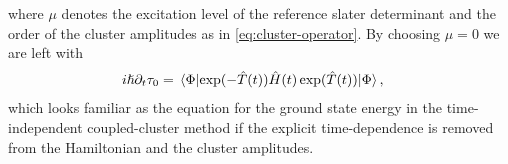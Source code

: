         where $\mu$ denotes the excitation level of the reference slater
        determinant and the order of the cluster amplitudes as in
        \autoref{eq:cluster-operator}.
        By choosing $\mu = 0$ we are left with
        \begin{align}
            i\hslash \partial_t\clustamp_{0}
            &=
            \mel*{\slat}{
                \exponential(-\clust(t))
                \hamil(t)
                \exponential(\clust(t))
            }{\slat},
        \end{align}
        which looks familiar as the equation for the ground state
        energy in the time-independent coupled-cluster method if the
        explicit time-dependence is removed from the Hamiltonian and the
        cluster amplitudes.
